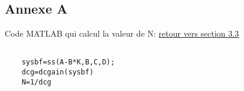 \begin{appendices}

\chapter*{Annexe A}
	
	Code MATLAB qui calcul la valeur de N: \label{Annexe A} \hyperref[section 3.3]{retour vers section 3.3}
	\begin{lstlisting}
	
	sysbf=ss(A-B*K,B,C,D);
	dcg=dcgain(sysbf) 
	N=1/dcg
	\end{lstlisting}

\end{appendices}
